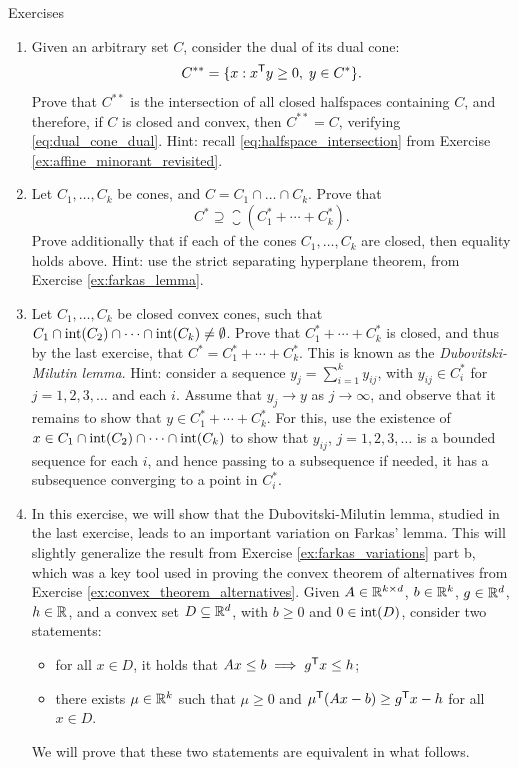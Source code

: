 \begin{xcb}{Exercises}
\begin{enumerate}[label=\thechapter.\arabic*]
\item \label{ex:dual_cone_dual}
  Given an arbitrary set $C$, consider the dual of its dual cone: 
  \[
  C^{**} = \{x : x^{\mathsf{T}} y \geq 0, \; y \in C^*\}.
  \]
  Prove that $C^{**}$ is the intersection of all closed halfspaces containing
  $C$, and therefore, if $C$ is closed and convex, then $C^{**} = C$, verifying 
  \eqref{eq:dual_cone_dual}. Hint: recall \eqref{eq:halfspace_intersection} from
  Exercise \ref{ex:affine_minorant_revisited}. 

\item Let $C_1,\dots,C_k$ be cones, and $C = C_1 \cap \dots \cap C_k$. Prove
  that 
  \[
  C^* \supseteq \closure(C_1^* + \cdots + C_k^*).
  \]
  Prove additionally that if each of the cones $C_1,\dots,C_k$ are closed, then
  equality holds above. Hint: use the strict separating hyperplane theorem, from
  Exercise \ref{ex:farkas_lemma}.

\item \label{ex:dubovitski_milutin_lemma}
  Let $C_1,\dots,C_k$ be closed convex cones, such that $C_1 \cap \operatorname{int}(C_2) 
  \cap \cdots \cap \operatorname{int}(C_k) \not= \emptyset$. Prove that $C_1 ^* + \cdots
  + C_k^*$ is closed, and thus by the last exercise, that $C^* = C_1^* + \cdots
  + C_k^*$. This is known as the \emph{Dubovitski-Milutin lemma}. Hint: consider
  a sequence $y_j = \sum_{i=1}^k y_{ij}$, with $y_{ij} \in C_i^*$ for $j =
  1,2,3,\dots$ and each $i$. Assume that $y_j \to y$ as $j \to \infty$, and
  observe that it remains to show that $y \in C_1^* + \cdots + C_k^*$. For this,
  use the existence of $x \in C_1 \cap \operatorname{int}(C_2) \cap \cdots \cap
  \operatorname{int}(C_k)$ to show that $y_{ij}$, $j = 1,2,3,\dots$ is a bounded sequence
  for each $i$, and hence passing to a subsequence if needed, it has a
  subsequence converging to a point in $C_i^*$. 

\item \label{ex:farkas_variations_conic} 
  In this exercise, we will show that the Dubovitski-Milutin lemma, studied in
  the last exercise, leads to an important variation on Farkas' lemma. This will 
  slightly generalize the result from Exercise \ref{ex:farkas_variations} part
  b, which was a key tool used in proving the convex theorem of alternatives
  from Exercise \ref{ex:convex_theorem_alternatives}. Given $A \in \mathbb{R}^{k \times
    d}$, $b \in \mathbb{R}^k$, $g \in \mathbb{R}^d$, $h \in \mathbb{R}$, and a convex set $D \subseteq
  \mathbb{R}^d$, with $b \geq 0$ and $0 \in \operatorname{int}(D)$, consider two statements:       
  \begin{itemize}
  \item for all $x \in D$, it holds that $Ax \leq b \implies g^{\mathsf{T}} x \leq h$;  
  \item there exists $\mu \in \mathbb{R}^k$ such that $\mu \geq 0$ and $\mu^{\mathsf{T}} (Ax - b) 
    \geq g^{\mathsf{T}} x - h$ for all $x \in D$.
  \end{itemize}
  We will prove that these two statements are equivalent in what follows.
  

\end{enumerate}
\end{xcb}
